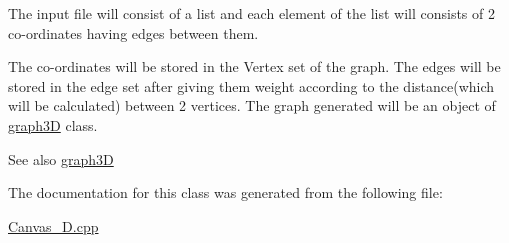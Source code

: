 The input file will consist of a list and each element of the list will consists of 2 co-\/ordinates having edges between them. 

The co-\/ordinates will be stored in the Vertex set of the graph. The edges will be stored in the edge set after giving them weight according to the distance(which will be calculated) between 2 vertices. The graph generated will be an object of \hyperlink{classgraph3D}{graph3D} class. \begin{DoxySeeAlso}{See also}
\hyperlink{classgraph3D}{graph3D} 
\end{DoxySeeAlso}


The documentation for this class was generated from the following file\+:\begin{DoxyCompactItemize}
\item 
\hyperlink{Canvas__3D_8cpp}{Canvas\+\_\+D.\+cpp}\end{DoxyCompactItemize}
